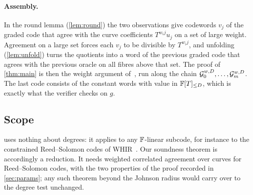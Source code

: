 \paragraph{Assembly.} In the round lemma (\cref{lem:round}) the two observations give
codewords $v_j$ of the graded code that agree with the curve coefficients $T^{w_ij}u_j$ on a
set of large weight. Agreement on a large set forces each $v_j$ to be divisible by
$T^{w_ij}$, and unfolding (\cref{lem:unfold}) turns the quotients into a word of the
previous graded code that agrees with the previous oracle on all fibres above that set. The
proof of \cref{thm:main} is then the weight argument of~\cite[Lemma~8.2]{BCIKS20}, run along
the chain $\mathcal{G}_0^{w,D},\dots,\mathcal{G}_m^{w,D}$. The last code consists of the constant words with
value in $\mathbb{F}[T]_{\le D}$, which is exactly what the verifier checks on $g$.

\subsection{Scope}\label{sec:ov-scope}

 uses nothing about degrees: it applies to any $\mathbb{F}$-linear subcode, for
instance to the constrained Reed--Solomon codes of WHIR~\cite{ACFY25}. Our soundness theorem
is accordingly a reduction. It needs weighted correlated agreement over curves for
Reed--Solomon codes, with the two properties of the proof recorded in \cref{sec:params};
any such theorem beyond the Johnson radius would carry over to the degree test unchanged.
